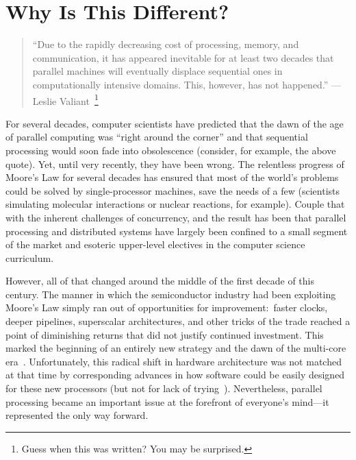 \section{Why Is This Different?}

\begin{quote}
``Due to the rapidly decreasing cost of processing, memory, and
  communication, it has appeared inevitable for at least two decades
  that parallel machines will eventually displace sequential ones in
  computationally intensive domains.  This, however, has not
  happened.'' --- Leslie
  Valiant~\cite{Valiant_CACM1990}\footnote{Guess when this was
    written?  You may be surprised.}
\end{quote}

For several decades, computer scientists have predicted that the dawn
of the age of parallel computing was ``right around the corner'' and
that sequential processing would soon fade into obsolescence
(consider, for example, the above quote).  Yet, until very recently,
they have been wrong.  The relentless progress of Moore's Law for
several decades has ensured that most of the world's problems could be
solved by single-processor machines, save the needs of a few
(scientists simulating molecular interactions or nuclear reactions,
for example).  Couple that with the inherent challenges of
concurrency, and the result has been that parallel processing and
distributed systems have largely been confined to a small segment of
the market and esoteric upper-level electives in the computer science
curriculum.

However, all of that changed around the middle of the first decade of
this century.  The manner in which the semiconductor industry had been
exploiting Moore's Law simply ran out of opportunities for
improvement:\ faster clocks, deeper pipelines, superscalar
architectures, and other tricks of the trade reached a point of
diminishing returns that did not justify continued investment.  This
marked the beginning of an entirely new strategy and the dawn of the
multi-core era~\cite{Olukotun_Hammond_2005}.  Unfortunately, this
radical shift in hardware architecture was not matched at that time by
corresponding advances in how software could be easily designed for
these new processors (but not for lack of trying~\cite{McCool_2008}).
Nevertheless, parallel processing became an important issue at the
forefront of everyone's mind---it represented the only way forward.

